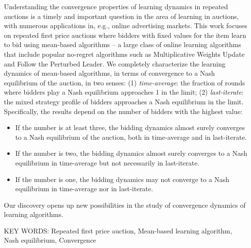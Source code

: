 Understanding the convergence properties of learning dynamics in repeated auctions is a timely and important question in the area of learning in auctions, with numerous applications in, e.g., online advertising markets. This work focuses on repeated first price auctions where bidders with fixed values for the item learn to bid using mean-based algorithms -- a large class of online learning algorithms that include popular no-regret algorithms such as Multiplicative Weights Update and Follow the Perturbed Leader. We completely characterize the learning dynamics of mean-based algorithms, in terms of convergence to a Nash equilibrium of the auction, in two senses: (1) \emph{time-average}: the fraction of rounds where bidders play a Nash equilibrium approaches 1 in the limit; (2) \emph{last-iterate}: the mixed strategy profile of bidders approaches a Nash equilibrium in the limit. Specifically, the results depend on the number of bidders with the highest value:
\begin{itemize}
    \item If the number is at least three, the bidding dynamics almost surely converges to a Nash equilibrium of the auction, both in time-average and in last-iterate.  
    \item If the number is two, the bidding dynamics almost surely converges to a Nash equilibrium in time-average but not necessarily in last-iterate.
    \item If the number is one, the bidding dynamics may not converge to a Nash equilibrium in time-average nor in last-iterate. 
\end{itemize}
Our discovery opens up new possibilities in the study of convergence dynamics of learning algorithms.

\bigskip
\bigskip

KEY WORDS: Repeated first price auction, Mean-based learning algorithm, Nash equilibrium, Convergence
